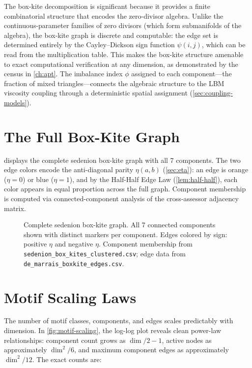 \documentclass[12pt,openany]{report}
\theoremstyle{definition}
\theoremstyle{plain}
\theoremstyle{remark}
\begin{document}
The box-kite decomposition is significant because it provides a
finite combinatorial structure that encodes the zero-divisor algebra.
Unlike the continuous-parameter families of zero divisors (which form
submanifolds of the algebra), the box-kite graph is discrete and
computable: the edge set is determined entirely by the Cayley--Dickson
sign function $\psi(i,j)$, which can be read from the multiplication
table.  This makes the box-kite structure amenable to exact computational
verification at any dimension, as demonstrated by the census in
\cref{ch:apt}.  The imbalance index $\phi$ assigned to each
component---the fraction of mixed triangles---connects the algebraic
structure to the LBM viscosity coupling through a deterministic spatial
assignment (\cref{sec:coupling-models}).

\section{The Full Box-Kite Graph}

 displays the complete sedenion box-kite graph
with all 7 components.  The two edge colors encode the anti-diagonal
parity $\eta(a,b)$ (\cref{sec:eta}): an edge is orange ($\eta = 0$) or
blue ($\eta = 1$), and by the Half-Half Edge Law
(\cref{lem:half-half}), each color appears in equal proportion across
the full graph.  Component membership is computed via connected-component
analysis of the cross-assessor adjacency matrix.

\begin{figure}[htbp]
\centering

\caption{Complete sedenion box-kite graph.  All 7 connected components
shown with distinct markers per component.  Edges colored by sign:
\textcolor{OIorange}{positive $\eta$} and
\textcolor{OIblue}{negative $\eta$}.  Component membership from
\texttt{sedenion\_box\_kites\_clustered.csv}; edge data from
\texttt{de\_marrais\_boxkite\_edges.csv}.}
\label{fig:boxkite-full}
\end{figure}

\section{Motif Scaling Laws}

The number of motif classes, components, and edges scales predictably
with dimension.  In \cref{fig:motif-scaling}, the log-log plot reveals
clean power-law relationships: component count grows as $\dim/2 - 1$,
active nodes as approximately $\dim^2/6$, and maximum component edges
as approximately $\dim^2/12$.  The exact counts are:
\end{document}
